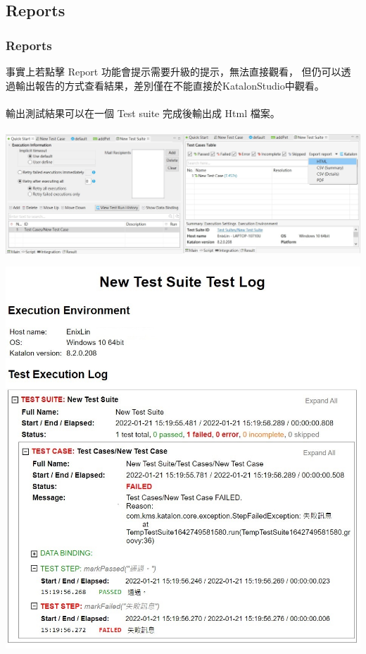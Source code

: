 \documentclass{beamer}
\begin{document}
\subsection{Reports}
\begin{frame}
    \frametitle{Reports}
    事實上若點擊 Report 功能會提示需要升級的提示，無法直接觀看，
    但仍可以透過輸出報告的方式查看結果，差別僅在不能直接於KatalonStudio中觀看。~\\~\\
    輸出測試結果可以在一個 Test suite 完成後輸出成 Html 檔案。~\\~\\
    \includegraphics[width=1\textwidth]{picture/輸出報告.jpg}
\end{frame}
\begin{frame}
    \begin{center}
        \includegraphics[height=0.95\textheight]{picture/reportHtml.jpg}
    \end{center}
\end{frame}
\ifx\allfiles\undefined
\end{document}
